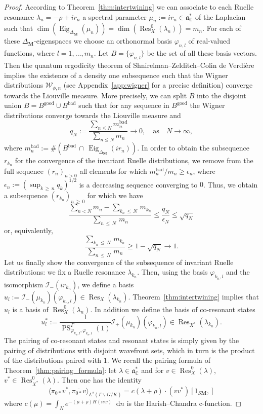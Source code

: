\documentclass[AHL, Unicode, longabstracts, published]{cedram}
\DeclareMathOperator{\Res}{Res}
\DeclareMathOperator{\Eig}{Eig}
\DeclareMathOperator{\good}{good}
\DeclareMathOperator{\bad}{bad}
\newcommand{\cc}{\mathbb{C}}
\newcommand{\bfm}{\mathbf{M}}
\newcommand{\la}{\lambda}
\newcommand{\eps}{\epsilon}
\newcommand{\intd}{\mathop{}\!\mathrm{d}}
\renewcommand{\a}{\mathfrak a}
\begin{document}
\begin{proof}
According to Theorem~\ref{thm:intertwining} we can associate to each Ruelle resonance $\la_n=-\rho+ir_n$ a spectral parameter $\mu_n:=ir_n \in \a^*_\cc$ of the Laplacian such that $\dim(\Eig_{\Delta_{\bfm}}(\mu_n))=\dim(\Res^{0}_{X}(\la_n)) = m_n$. For each of these $\Delta_{\bfm}$-eigenspaces we choose an orthonormal basis $\varphi_{n,l}$ of real-valued functions, where $l=1,\ldots,m_n$. Let $B= \{\varphi_{n,l}\}$ be the set of all these basis vectors. Then the quantum ergodicity theorem of Shnirelman--Zelditch--Colin de Verdière~\cite{Shn74, CdV85, Zel87} implies the existence of a density one subsequence such that the Wigner distributions $\mathcal W_{\phi, n}$ (see Appendix~\ref{app:wigner} for a precise definition) converge towards the Liouville measure. More precisely, we can split $B$ into the disjoint union $B=B^{\good}\cup B^{\bad}$ such that for any sequence in $B^{\good}$ the Wigner distributions converge towards the Liouville measure and
\[
q_N:= \frac{\sum_{n\leq N} m_n^{\bad} }{\sum_{n\leq N} m_n}\to 0,\quad\text{as}\quad N\to\infty,
\]
where $m_n^{\bad}:=\# (B^{\bad}\,\cap\,\Eig_{\Delta_{\bfm}}(ir_n))$. In order to obtain the subsequence $r_{k_n}$ for the convergence of the invariant Ruelle distributions, we remove from the full sequence $(r_n)_{n>0}$ all elements for which $m_n^{\bad}/m_n \geq \eps_n$, where $\eps_n:=(\sup_{k\,\geq\,n}q_k)^{1/2}$ is a decreasing sequence converging to $0$. Thus, we obtain a subsequence $(r_{k_n})_{n\,\geq\,0}$ for which we have
\[
\frac{\sum_{n< N} m_{n}-\sum_{k_n\,\leq\,N}\,m_{k_n}}{\sum_{n\,\leq\,N}\,m_n}
\leq \frac{q_N}{\eps_N}\leq \sqrt{q_N}
\]
or, equivalently,
\[
\frac{\sum_{k_n\,\leq\,N}\,m_{k_n}}{\sum_{n\,\leq\,N}\,m_n}\geq 1-\sqrt{q_N}\to 1.
\]
Let us finally show the convergence of the subsequence of invariant Ruelle distributions: we fix a Ruelle resonance $\la_{k_n}$. Then, using the basis $\varphi_{k_n,l}$ and the isomorphism $\mathcal I_-(ir_{k_n})$, we define a basis $u_l:= \mathcal I_-(\mu_{k_n})(\varphi_{k_n, l}) \in \Res_{X}(\la_{k_n})$. Theorem~\ref{thm:intertwining} implies that $u_l$ is a basis of $\Res^0_{X}(\la_n)$. In addition we define the basis of co-resonant states
\[
u_l^*:= \frac{1}{\operatorname{PS}^\Gamma_ {\varphi_{k_n,l},\varphi_{k_n,l}}(1)}\mathcal I_+(\mu_{k_n})(\varphi_{k_n,l})\in
\Res_{X^*}(\la_{k_n}).
\]
The pairing of co-resonant states and resonant states is simply given by the pairing of distributions with disjoint wavefront sets, which in turn is the product of the distributions paired with $1$. We recall the pairing formula of Theorem~\ref{thm:pairing_formula}: let $\lambda \in \a_\cc^*$ and for $v\in \Res_{X}^0(\lambda)$, $v^*\in \Res_{X^*}^0(\lambda)$. Then one has the identity
\begin{equation}\label{eq:pairing}
\langle\pi_{0*} v^*, \overline{\pi_{0*}v} \rangle_{L^2(\Gamma\backslash G/K)} = c(\lambda + \rho)\cdot (v v^*)[1_{S\mathbf M},]
\end{equation}
where $c(\mu) = \int_N e^{-(\mu + \rho)H(nw)}\intd n$ is the Harish--Chandra c-function.


\end{proof}
\end{document}
